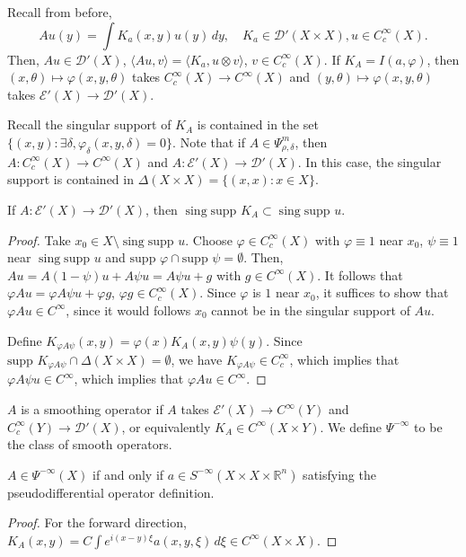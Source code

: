 \documentclass[12pt]{scrartcl}
\newcommand{\R}{\mathbb{R}}
\newcommand{\<}{\langle}
\renewcommand{\>}{\rangle}
\let \phi \varphi
\let \mc \mathcal
\newcommand{\supp}{\text{supp }}
\let \tensor \otimes
\begin{document}
Recall from before,
$$Au(y) = \int K_a(x, y)u(y)\,dy, \quad K_a \in \mc D'(X \times X), u \in C_c^\infty(X).$$
Then, $Au \in \mc D'(X)$, $\<Au, v\> = \<K_a, u \tensor v\>$, $v \in C_c^\infty(X)$.  If $K_A = I(a, \phi)$, then $(x, \theta) \mapsto \phi(x, y, \theta)$ takes $C_c^\infty(X) \to C^\infty(X)$ and $(y, \theta)\mapsto \phi(x, y, \theta)$ takes $\mc E'(X) \to \mc D'(X)$.

Recall the singular support of $K_A$ is contained in the set $\{(x, y) : \exists \delta, \phi_\delta(x, y, \delta) = 0\}$.  Note that if $A \in \Psi_{\rho, \delta}^m$, then $A: C_c^\infty(X) \to C^\infty(X)$ and $A:\mc E'(X) \to \mc D'(X)$.  In this case, the singular support is contained in $\Delta(X \times X) = \{(x, x): x \in X\}$.

\begin{proposition}[Semilocality] If $A: \mc E'(X) \to \mc D'(X)$, then $\operatorname{sing}{\supp K_A} \subset \operatorname{sing}{\supp u}$.
\end{proposition}
\begin{proof}
Take $x_0 \in X \setminus\operatorname{sing}{\supp u}$.  Choose $\phi \in C_c^\infty(X)$ with $\phi \equiv 1$ near $x_0$, $\psi \equiv 1$ near $\operatorname{sing}{\supp u}$ and $\supp \phi \cap \supp \psi = \emptyset$.  Then, $Au = A(1 - \psi)u + A\psi u = A \psi u + g$ with $g \in C^\infty(X)$.  It follows that 
$\phi A u = \phi A \psi u + \phi g$, $\phi g \in C_c^\infty(X)$.  Since $\phi$ is $1$ near $x_0$, it suffices to show that $\phi A u \in C^\infty$, since it would follows $x_0$ cannot be in the singular support of $Au$.

Define $K_{\phi A \psi}(x, y) = \phi(x) K_A(x, y) \psi(y)$.  Since $\supp K_{\phi A \psi} \cap \Delta(X \times X) = \emptyset$, we have $K_{\phi A \psi} \in C_c^\infty$, which implies that $\phi A \psi u \in C^\infty$, which implies that $\phi A u \in C^\infty$.
\end{proof}
\begin{definition} $A$ is a smoothing operator if $A$ takes $\mc E'(X) \to C^\infty(Y)$ and $C_c^\infty(Y) \to \mc D'(X)$, or equivalently $K_A \in C^\infty(X \times Y)$.  We define $\Psi^{-\infty}$ to be the class of smooth operators.  
\end{definition}
\begin{proposition} $A \in \Psi^{-\infty}(X)$ if and only if $a \in S^{-\infty}(X \times X \times \R^n)$ satisfying the pseudodifferential operator definition.
\end{proposition}
\begin{proof}
For the forward direction, $K_A(x, y) =C \int e^{i(x - y)\xi} a(x, y, \xi)\,d\xi \in C^\infty(X \times X)$.
\end{proof}

\pagebreak
\end{document}
